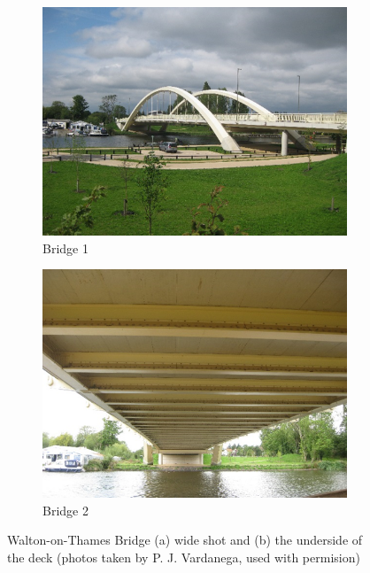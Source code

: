 \documentclass[a4paper,10pt]{article}
\begin{document}
\begin{figure}[ht]
     \centering
     \begin{subfigure}[b]{0.45\textwidth}
         \centering
         \includegraphics[width=\textwidth]{figures/fig_bridge1}
         \caption{Bridge 1}
         \label{fig_bridge1}
     \end{subfigure}
     \hfill
     \begin{subfigure}[b]{0.45\textwidth}
         \centering
         \includegraphics[width=\textwidth]{figures/fig_bridge2}
         \caption{Bridge 2}
         \label{fig_bridge2}
     \end{subfigure}
        \caption{Walton-on-Thames Bridge (a) wide shot and (b) the underside of the deck
(photos taken by P. J. Vardanega, used with permision)}
        \label{fig_twobridges}
\end{figure}
\end{document}
